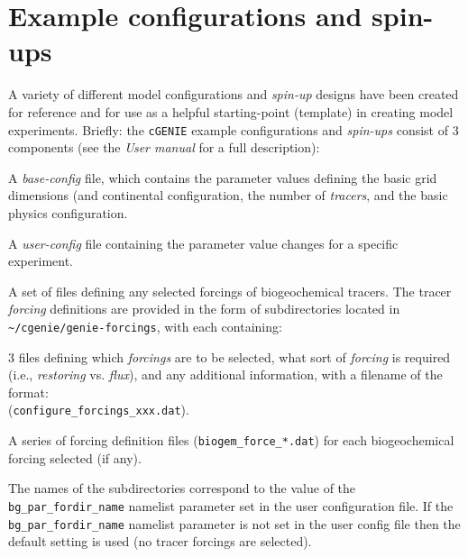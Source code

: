 \documentclass[10pt,twoside]{article}
\begin{document}

\newpage
\section{Example configurations and spin-ups}\label{Example configurations and spin-ups}

A variety of different model configurations and \textit{spin-up} designs have been created for reference and for use as a helpful starting-point (template) in creating model experiments.
Briefly: the \texttt{cGENIE} example configurations and \textit{spin-ups} consist of 3 components (see the \textit{User manual} for a full description):

\begin{compactenum}

	\item A \textit{base-config} file, which contains the parameter values defining the basic grid dimensions (and continental configuration, the number of \textit{tracers}, and the basic physics configuration.
	
	\item A \textit{user-config} file containing the parameter value changes for a specific experiment.
	
	\item A set of files defining any selected forcings of biogeochemical tracers. The tracer \textit{forcing} definitions are provided in the form of subdirectories located in \texttt{\~{}/cgenie/genie-forcings}, with each containing:
	
	\begin{compactitem}
		\item 3 files defining which \textit{forcings} are to be selected, what sort of \textit{forcing} is required (i.e., \textit{restoring} vs. \textit{flux}), and any additional information, with a filename of the format:
		\\ (\texttt{configure\_forcings\_xxx.dat}).
		\item A series of forcing definition files (\texttt{biogem\_force\_*.dat}) for each biogeochemical forcing selected (if any).
	\end{compactitem}
	
	The names of the subdirectories correspond to the value of the \texttt{bg\_par\_fordir\_name} namelist parameter set in the user configuration file. If the \texttt{bg\_par\_fordir\_name} namelist parameter is not set in the user config file then the default setting is used (no tracer forcings are selected).
	
\end{compactenum}
\end{document}
